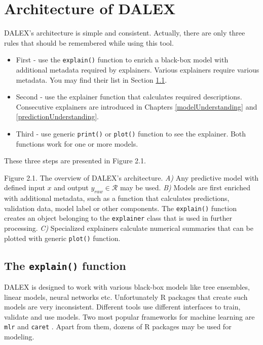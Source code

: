 \documentclass[]{book}
\providecommand{\tightlist}{%
  \setlength{\itemsep}{0pt}\setlength{\parskip}{0pt}}
\theoremstyle{definition}
\theoremstyle{definition}
\theoremstyle{definition}
\theoremstyle{remark}
\begin{document}
\hypertarget{architecture}{%
\chapter{Architecture of DALEX}\label{architecture}}

DALEX's architecture is simple and consistent. Actually, there are only
three rules that should be remembered while using this tool.

\begin{itemize}
\tightlist
\item
  First - use the \texttt{explain()} function to enrich a black-box
  model with additional metadata required by explainers. Various
  explainers require various metadata. You may find their list in
  Section \ref{explainFunction}.
\item
  Second - use the explainer function that calculates required
  descriptions. Consecutive explainers are introduced in Chapters
  \ref{modelUnderstanding} and \ref{predictionUnderstanding}.
\item
  Third - use generic \texttt{print()} or \texttt{plot()} function to
  see the explainer. Both functions work for one or more models.
\end{itemize}

These three steps are presented in Figure 2.1.

{Figure 2.1. The overview of DALEX's architecture. \emph{A)} Any
predictive model with defined input \(x\) and output
\(y_{raw} \in \mathcal R\) may be used. \emph{B)} Models are first
enriched with additional metadata, such as a function that calculates
predictions, validation data, model label or other components. The
\texttt{explain()} function creates an object belonging to the
\texttt{explainer} class that is used in further processing. \emph{C)}
Specialized explainers calculate numerical summaries that can be plotted
with generic \texttt{plot()} function. }

\hypertarget{explainFunction}{%
\section{\texorpdfstring{The \texttt{explain()}
function}{The explain() function}}\label{explainFunction}}

DALEX is designed to work with various black-box models like tree
ensembles, linear models, neural networks etc. Unfortunately R packages
that create such models are very inconsistent. Different tools use
different interfaces to train, validate and use models. Two most popular
frameworks for machine learning are \texttt{mlr} \citep{mlr} and
\texttt{caret} \citep{caret}. Apart from them, dozens of R packages may
be used for modeling.
\end{document}
